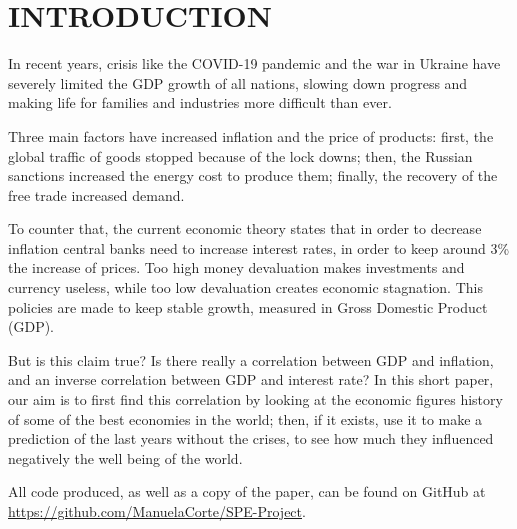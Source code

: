 \section{INTRODUCTION}
In recent years, crisis like the COVID-19 pandemic and the war in Ukraine have severely limited the GDP growth of all nations, slowing down progress and making life for families and industries more difficult than ever.

Three main factors have increased inflation and the price of products: first, the global traffic of goods stopped because of the lock downs; then, the Russian sanctions increased the energy cost to produce them; finally, the recovery of the free trade increased demand.

To counter that, the current economic theory states that in order to decrease inflation central banks need to increase interest rates, in order to keep around 3\% the increase of prices. Too high money devaluation makes investments and currency useless, while too low devaluation creates economic stagnation. This policies are made to keep stable growth, measured in Gross Domestic Product (GDP).

But is this claim true? Is there really a correlation between GDP and inflation, and an inverse correlation between GDP and interest rate? In this short paper, our aim is to first find this correlation by looking at the economic figures history of some of the best economies in the world; then, if it exists, use it to make a prediction of the last years without the crises, to see how much they influenced negatively the well being of the world.

All code produced, as well as a copy of the paper, can be found on GitHub at \href{https://github.com/ManuelaCorte/SPE-Project}{https://github.com/ManuelaCorte/SPE-Project}.
